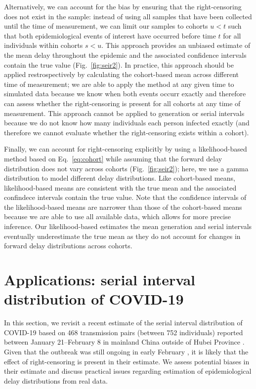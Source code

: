 \documentclass[12pt]{article}
\newcommand{\eref}[1]{Eq.~\ref{eq:#1}}
\newcommand{\fref}[1]{Fig.~\ref{fig:#1}}
\begin{document}
Alternatively, we can account for the bias by ensuring that the right-censoring does not exist in the sample:
instead of using all samples that have been collected until the time of measurement, we can limit our samples to cohorts $u < t$ such that both epidemiological events of interest have occurred before time $t$ for all individuals within cohorts $s < u$.
This approach provides an unbiased estimate of the mean delay throughout the epidemic and the associated confidence intervals contain the true value (\fref{seir2}).
In practice, this approach should be applied restrospectively by calculating the cohort-based mean across different time of measurement; we are able to apply the method at any given time to simulated data because we know when both events occurr exactly and therefore can assess whether the right-censoring is present for all cohorts at any time of measurement.
This approach cannot be applied to generation or serial intervals because we do not know how many individuals each person infected exactly (and therefore we cannot evaluate whether the right-censoring exists within a cohort).

Finally, we can account for right-censoring explicitly by using a likelihood-based method based on \eref{cohort} while assuming that the forward delay distribution does not vary across cohorts (\fref{seir2});
here, we use a gamma distribution to model different delay distributions.
Like cohort-based means, likelihood-based means are consistent with the true mean and the associated confindece intervals contain the true value.
Note that the confidence intervals of the likelihood-based means are narrower than those of the cohort-based means because we are able to use all available data, which allows for more precise inference.
Our likelihood-based estimates the mean generation and serial intervals eventually underestimate the true mean as they do not account for changes in forward delay distributions across cohorts.

\section{Applications: serial interval distribution of COVID-19}

In this section, we revisit a recent estimate of the serial interval distribution of COVID-19 based on 468 transmission pairs (between 752 individuals) reported between January 21–February 8 in mainland China outside of Hubei Province \cite{du2020serial}.
Given that the outbreak was still ongoing in early February \citep{wu2020characteristics}, it is likely that the effect of right-censoring is present in their estimate.
We assess potential biases in their estimate and discuss practical issues regarding estimation of epidemiological delay distributions from real data.
\end{document}
